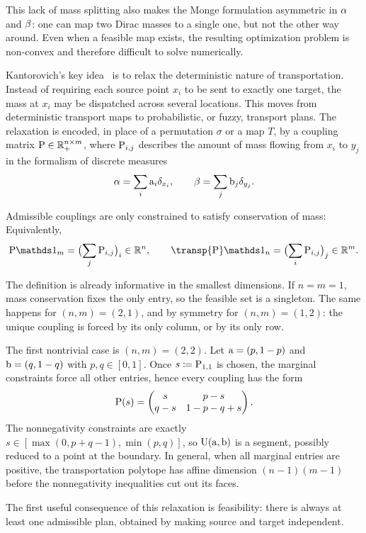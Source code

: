 This lack of mass splitting also makes the Monge formulation asymmetric in $\al$ and $\be$: one can map two Dirac masses to a single one, but not the other way around. Even when a feasible map exists, the resulting optimization problem is non-convex and therefore difficult to solve numerically.

Kantorovich's key idea~\cite{Kantorovich42} is to relax the deterministic nature of transportation. Instead of requiring each source point $x_i$ to be sent to exactly one target, the mass at $x_i$ may be dispatched across several locations. This moves from deterministic transport maps to probabilistic, or fuzzy, transport plans. The relaxation is encoded, in place of a permutation $\sigma$ or a map $T$, by a coupling matrix $\P\in\RR_+^{n\times m}$, where $\P_{i,j}$ describes the amount of mass flowing from $x_i$ to $y_j$ in the formalism of discrete measures
\[
	\al=\sum_i \a_i\de_{x_i},
	\qquad
	\be=\sum_j \b_j\de_{y_j}.
\]
\begin{defn}\label{def-discrete-couplings}
	Admissible couplings are only constrained to satisfy conservation of mass:
	Equivalently,
	\[
		\P\ones_m=\bigl(\sum_j \P_{i,j}\bigr)_i\in\RR^n,
		\qquad
		\transp{\P}\ones_n=\bigl(\sum_i \P_{i,j}\bigr)_j\in\RR^m.
	\]
\end{defn}
\begin{rem}\label{rem-small-transportation-polytopes}
	The definition is already informative in the smallest dimensions. If $n=m=1$, mass conservation fixes the only entry, so the feasible set is a singleton. The same happens for $(n,m)=(2,1)$, and by symmetry for $(n,m)=(1,2)$: the unique coupling is forced by its only column, or by its only row.

	The first nontrivial case is $(n,m)=(2,2)$. Let $\a=(p,1-p)$ and $\b=(q,1-q)$ with $p,q\in[0,1]$. Once $s\eqdef \P_{1,1}$ is chosen, the marginal constraints force all other entries, hence every coupling has the form
	\[
		\P(s)=
		\begin{pmatrix}
			s & p-s \\
			q-s & 1-p-q+s
		\end{pmatrix}.
	\]
	The nonnegativity constraints are exactly $s\in[\max(0,p+q-1),\min(p,q)]$, so $\CouplingsD(\a,\b)$ is a segment, possibly reduced to a point at the boundary. In general, when all marginal entries are positive, the transportation polytope has affine dimension $(n-1)(m-1)$ before the nonnegativity inequalities cut out its faces.
\end{rem}
The first useful consequence of this relaxation is feasibility: there is always at least one admissible plan, obtained by making source and target independent.

